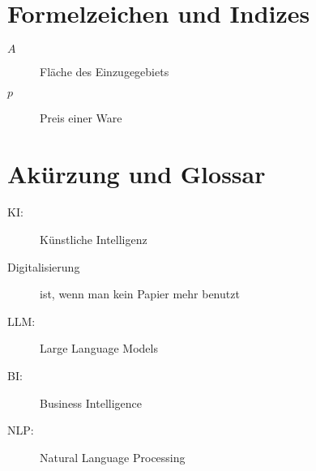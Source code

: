
\section *{Formelzeichen und Indizes} %

\begin{description}
\item[$A$] Fläche des Einzugegebiets
\item[$p$] Preis einer Ware
\end{description}

\section *{Akürzung und Glossar}
\begin{description}
\item[KI:] Künstliche Intelligenz
\item[Digitalisierung] ist, wenn man kein Papier mehr benutzt
\item[LLM:] Large Language Models
\item[BI:] Business Intelligence
\item[NLP:] Natural Language Processing
\end{description}
